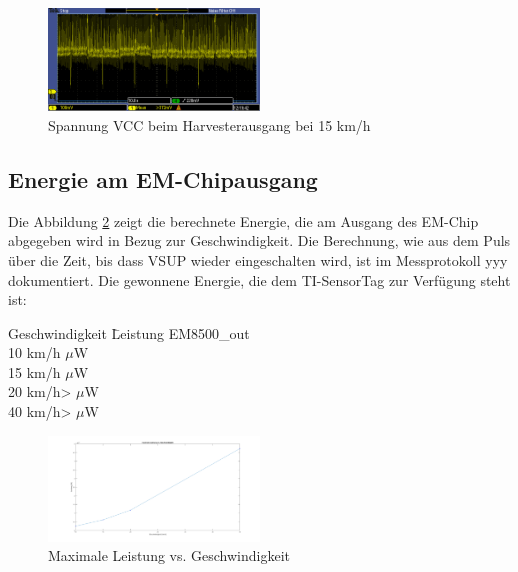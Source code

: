 \begin{figure}[ht]
    \includegraphics[width=0.5\textwidth]{4Resultate/imag/SpannungVCC_100uF.png} 
    \caption{Spannung VCC beim Harvesterausgang bei 15 km/h}
    \label{resultat_Harvester_Spannung_100uF}
\end{figure}


\subsection{Energie am EM-Chipausgang}

Die Abbildung \ref{energie_resultat_harvester} zeigt die berechnete Energie, die am Ausgang des EM-Chip abgegeben wird in Bezug zur Geschwindigkeit. Die Berechnung, wie aus dem Puls über die Zeit, bis dass VSUP wieder eingeschalten wird, ist im  Messprotokoll yyy dokumentiert. Die gewonnene Energie, die dem TI-SensorTag zur Verfügung steht ist:


\begin{minipage}{\textwidth}
    \label{res_em_aus}
    \begin{tabbing}
        Geschwindigkeit \quad\= Leistung EM8500\_out \\[0.8ex]
        10 km/h     $\mu$W\\
        15 km/h    $\mu$W\\
        20 km/h>   $\mu$W\\
        40 km/h>  $\mu$W\\
    \end{tabbing}
\end{minipage}


\begin{figure}[ht]
    \includegraphics[width=0.5\textwidth]{4Resultate/imag/ResultatLeistungGeschwindigkeit.png} 
    \caption{Maximale Leistung vs. Geschwindigkeit}
    \label{energie_resultat_harvester}
\end{figure}

